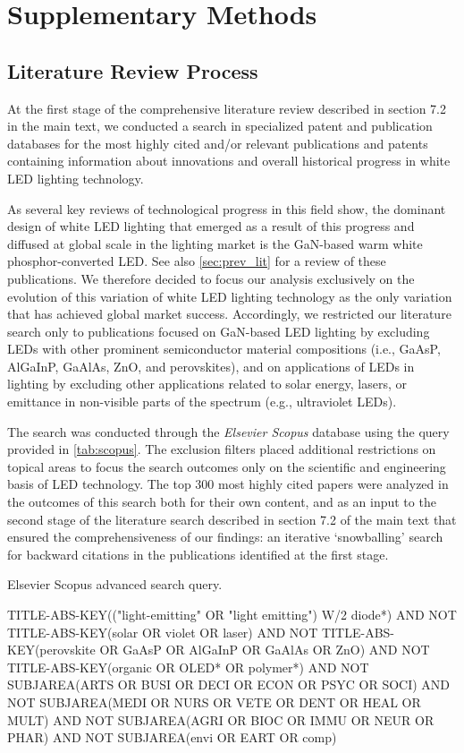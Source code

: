 \documentclass[parskip=full]{article}
\begin{document}
\clearpage
\section{Supplementary Methods}

\subsection{Literature Review Process}
\label{sec:litrev}

At the first stage of the comprehensive literature review described in section 7.2 in the main text, we conducted a search in specialized patent and publication databases for the most highly cited and/or relevant publications and patents containing information about innovations and overall historical progress in white LED lighting technology.

As several key reviews of technological progress in this field show, the dominant design of white LED lighting that emerged as a result of this progress and diffused at global scale in the lighting market is the GaN-based warm white phosphor-converted LED. See also \cref{sec:prev_lit} for a review of these publications. We therefore decided to focus our analysis exclusively on the evolution of this variation of white LED lighting technology as the only variation that has achieved global market success. Accordingly, we restricted our literature search only to publications focused on GaN-based LED lighting by excluding LEDs with other prominent semiconductor material compositions (i.e., GaAsP, AlGaInP, GaAlAs, ZnO, and perovskites), and on applications of LEDs in lighting by excluding other applications related to solar energy, lasers, or emittance in non-visible parts of the spectrum (e.g., ultraviolet LEDs).

The search was conducted through the \textit{Elsevier Scopus} database using the query provided in \cref{tab:scopus}. The exclusion filters placed additional restrictions on topical areas to focus the search outcomes only on the scientific and engineering basis of LED technology. The top 300 most highly cited papers were analyzed in the outcomes of this search both for their own content, and as an input to the second stage of the literature search described in section 7.2 of the main text that ensured the comprehensiveness of our findings: an iterative ‘snowballing’ search for backward citations in the publications identified at the first stage.

\begin{table}[h!]
\caption{Elsevier Scopus advanced search query.}
\begin{pseudocode}
TITLE-ABS-KEY(("light-emitting" OR "light emitting") W/2 diode*)
AND NOT
TITLE-ABS-KEY(solar OR violet OR laser)
AND NOT
TITLE-ABS-KEY(perovskite OR GaAsP OR AlGaInP OR GaAlAs OR ZnO)
AND NOT
TITLE-ABS-KEY(organic OR OLED* OR polymer*)
AND NOT
SUBJAREA(ARTS OR BUSI OR DECI OR ECON OR PSYC OR SOCI)
AND NOT
SUBJAREA(MEDI OR NURS OR VETE OR DENT OR HEAL OR MULT)
AND NOT
SUBJAREA(AGRI OR BIOC OR IMMU OR NEUR OR PHAR)
AND NOT
SUBJAREA(envi OR EART OR comp)
\end{pseudocode}
\label{tab:scopus}
\vspace{-4mm}
\end{table}
\end{document}
